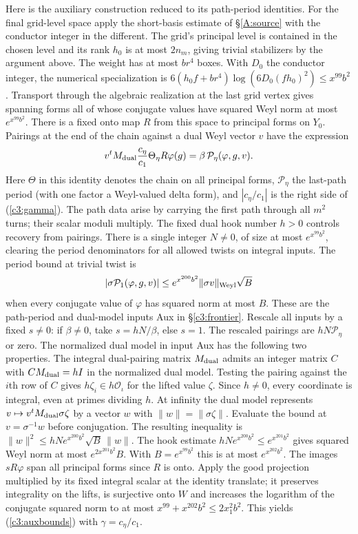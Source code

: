 Here is the auxiliary construction reduced to its path-period
identities. For the final grid-level space apply the short-basis estimate
of \S\ref{A:source} with the conductor integer in the different.
The grid's principal level is contained in the chosen level and its
rank $h_0$ is at most $2n_m$, giving trivial stabilizers by the
argument above. The weight has at most $b r^4$ boxes. With
$D_0$ the conductor integer, the numerical specialization is
$6(h_0 f+b r^4)\log(6D_0(fh_0)^2)\le x^{99}b^2$.
Transport through the algebraic realization at the last grid vertex
gives spanning forms all of whose conjugate values have squared
Weyl norm at most $e^{x^{99}b^2}$. There is a fixed onto map $R$
from this space to principal forms on $Y_0$. Pairings at the end
of the chain against a dual Weyl vector $v$ have the expression
\[
  v^t M_{\rm dual}
    \frac{c_\eta}{c_1}\Theta_\eta R\varphi(g)
    =\beta\,\mathcal P_\eta(\varphi,g,v).
\]
Here $\Theta$ in this identity denotes the chain on all principal
forms, $\mathcal P_\eta$ the last-path period (with one factor
a Weyl-valued delta form), and $|c_\eta/c_1|$ is the right side
of (\ref{c3:gamma}). The path data arise by carrying the first
path through all $m^2$ turns; their scalar moduli multiply. The
fixed dual hook number $h>0$ controls recovery from pairings.
There is a single integer $N\ne0$, of size at most
$e^{x^{99}b^2}$, clearing the period denominators for all allowed
twists on integral inputs. The period bound at trivial twist is
\[
 |\sigma\mathcal P_1(\varphi,g,v)|
 \le e^{x^{200}b^2}\|\sigma v\|_{\rm Weyl}
                  \sqrt{B}
\]
when every conjugate value of $\varphi$ has squared norm at most
$B$. These are the path-period and dual-model inputs Aux in
\S\ref{c3:frontier}. Rescale all inputs by a fixed $s\ne0$:
if $\beta\ne0$, take $s=hN/\beta$, else $s=1$.
The rescaled pairings are $hN\mathcal P_\eta$ or zero. The normalized dual model in input Aux has the following two properties. The integral dual-pairing matrix $M_{\rm dual}$ admits an integer
matrix $C$ with $CM_{\rm dual}=hI$ in the normalized dual model.
Testing the pairing against the $i$th row of $C$ gives
$h\zeta_i\in h\mathcal O_\iota$ for the lifted value $\zeta$.
Since $h\ne0$, every coordinate is integral, even at primes
dividing $h$. At infinity the dual model represents
$v\mapsto v^tM_{\rm dual}\sigma\zeta$ by a vector $w$ with
$\|w\|=\|\sigma\zeta\|$. Evaluate the bound at
$v=\sigma^{-1}w$ before conjugation. The resulting inequality is
$\|w\|^2\le hN e^{x^{200}b^2}\sqrt B\,\|w\|$.
The hook estimate $hN e^{x^{200}b^2}\le e^{x^{201}b^2}$ gives
squared Weyl norm at most $e^{2x^{201}b^2}B$. With
$B=e^{x^{99}b^2}$ this is at most $e^{x^{202}b^2}$.
The images $sR\varphi$ span all principal forms since $R$ is onto.
Apply the good projection multiplied by its fixed integral scalar
at the identity translate; it preserves integrality on the lifts,
is surjective onto $W$ and increases the logarithm of the conjugate
squared norm to at most $x^{99}+x^{202}b^2\le2x_1^2b^2$.
This yields (\ref{c3:auxbounds}) with $\gamma=c_\eta/c_1$.

